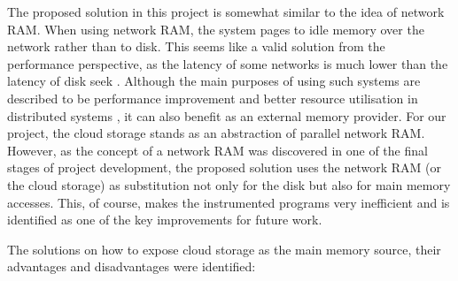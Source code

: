 \documentclass[bsc,frontabs,twoside,singlespacing,parskip,deptreport]{infthesis}     %
\begin{document}
The proposed solution in this project is somewhat similar to the idea of network RAM. When using network RAM, the system pages to idle memory over the network rather than to disk. This seems like a valid solution from the performance perspective, as the latency of some networks is much lower than the latency of disk seek \citep{numbers_should_know}. Although the main purposes of using such systems are described to be performance improvement \citep{Anderson:1998:ENR:893677} and better resource utilisation in distributed systems \citep{1327942}, it can also benefit as an external memory provider. For our project, the cloud storage stands as an abstraction of parallel network RAM. However, as the concept of a network RAM was discovered in one of the final stages of project development, the proposed solution uses the network RAM (or the cloud storage) as substitution not only for the disk but also for main memory accesses. This, of course, makes the instrumented programs very inefficient and is identified as one of the key improvements for future work.

The solutions on how to expose cloud storage as the main memory source, their advantages and disadvantages were identified:
\end{document}
